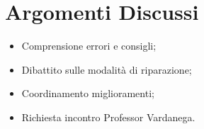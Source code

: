\section{Argomenti Discussi}
	\begin{itemize}
		\item Comprensione errori e consigli;
		\item Dibattito sulle modalità di riparazione;
		\item Coordinamento miglioramenti;
		\item Richiesta incontro Professor Vardanega.
	\end{itemize}